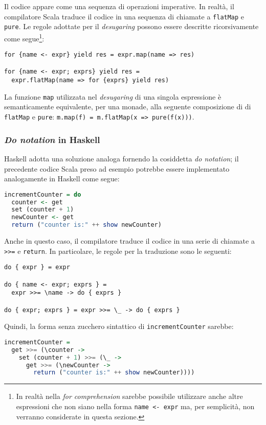 Il codice appare come una sequenza di operazioni imperative. In realtà, il compilatore Scala traduce il codice in una sequenza di chiamate a \lstinline{flatMap} e \lstinline{pure}.
Le regole adottate per il \emph{desugaring} possono essere descritte ricorsivamente come segue\footnote{In realtà nella \emph{for comprehension} sarebbe possibile utilizzare anche altre espressioni che non siano nella forma \lstinline{name <- expr} ma, per semplicità, non verranno considerate in questa sezione.}:

\begin{lstlisting}
for {name <- expr} yield res = expr.map(name => res)

for {name <- expr; exprs} yield res =
  expr.flatMap(name => for {exprs} yield res)
\end{lstlisting}

La funzione \lstinline{map} utilizzata nel \emph{desugaring} di una singola espressione è semanticamente equivalente, per una monade, alla seguente composizione di di \lstinline{flatMap} e \lstinline{pure}: \lstinline{m.map(f) = m.flatMap(x => pure(f(x)))}.

\subsubsection{\emph{Do notation} in Haskell}
Haskell adotta una soluzione analoga fornendo la cosiddetta \emph{do notation}; il precedente codice Scala preso ad esempio potrebbe essere implementato analogamente in Haskell come segue:
\begin{lstlisting}[language=haskell]
incrementCounter = do
  counter <- get
  set (counter + 1)
  newCounter <- get
  return ("counter is:" ++ show newCounter)
\end{lstlisting}
Anche in questo caso, il compilatore traduce il codice in una serie di chiamate a \lstinline{>>=} e \lstinline{return}. In particolare, le regole per la traduzione sono le seguenti:
\begin{lstlisting}
do { expr } = expr

do { name <- expr; exprs } =
  expr >>= \name -> do { exprs }

do { expr; exprs } = expr >>= \_ -> do { exprs }
\end{lstlisting}

Quindi, la forma senza zucchero sintattico di \lstinline{incrementCounter} sarebbe:
\begin{lstlisting}[language=haskell]
incrementCounter =
  get >>= (\counter ->
    set (counter + 1) >>= (\_ ->
      get >>= (\newCounter ->
        return ("counter is:" ++ show newCounter))))
\end{lstlisting}



